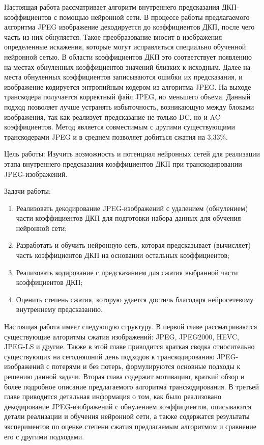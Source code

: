 \documentclass[times,specification,annotation]{itmo-student-thesis}
\begin{document}
Настоящая работа рассматривает алгоритм внутреннего предсказания ДКП-коэффициентов с помощью нейронной сети. В процессе работы предлагаемого алгоритма JPEG изображение декодируется до коэффициентов ДКП, после чего часть из них обнуляется. Такое преобразование вносит в изображения определенные искажения, которые могут исправляться специально обученной нейронной сетью. В области коэффициентов ДКП это соответствует появлению на местах обнуленных коэффициентов значений близких к исходным. Далее на места обнуленных коэффициентов записываются ошибки их предсказания, и изображение кодируется энтропийным кодером из алгоритма JPEG. На выходе транскодера получается корректный файл JPEG, но меньшего объема. Данный подход позволяет лучше устранять избыточность, возникающую между блоками изображения, так как реализует предсказание не только DC, но и AC-коэффициентов. Метод является совместимым с другими существующими транскодерами JPEG и в среднем позволяет добиться сжатия на 3,33\%.\par

Цель работы: Изучить возможность и потенциал нейронных сетей для реализации этапа внутреннего предсказания коэффициентов ДКП при транскодировании JPEG-изображений.
\par

Задачи работы:
\begin{enumerate}
    \item Реализовать декодирование JPEG-изображений с удалением (обнулением) части коэффициентов ДКП для подготовки набора данных для обучения нейронной сети;
    \item Разработать и обучить нейронную сеть, которая предсказывает (вычисляет) часть коэффициентов ДКП на основании остальных коэффициентов;
    \item Реализовать кодирование с предсказанием для сжатия выбранной части коэффициентов ДКП;
    \item Оценить степень сжатия, которую удается достичь благодаря нейросетевому внутреннему предсказанию.
\end{enumerate}

Настоящая работа имеет следующую структуру. В первой главе рассматриваются существующие алгоритмы сжатия изображений: JPEG, JPEG2000, HEVC, JPEG-LS и другие. Также в этой главе приводится краткая сводка относительно существующих на сегодняшний день подходов к транскодированию JPEG-изображений с потерями и без потерь, формулируются основные подходы к решению данной задачи. Вторая глава содержит мотивацию, краткий обзор и более подробное описание предлагаемого алгоритма транскодирования. В третьей главе приводится детальная информация о том, как было реализовано декодирование JPEG-изображений с обнулением коэффициентов, описываются детали реализации и обучения нейронной сети, а также содержатся результаты экспериментов по оценке степени сжатия предлагаемым алгоритмом и сравнение его с другими подходами.
\end{document}
